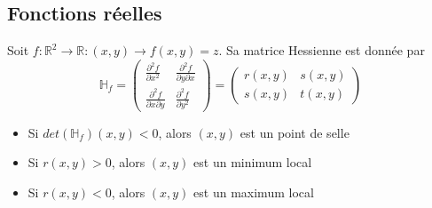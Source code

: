 \documentclass{article}
\begin{document}
\subsection{Fonctions réelles}
Soit $ f : \mathbb{R}^2 \rightarrow \mathbb{R} : (x, y) \rightarrow f(x, y) = z $. 
Sa matrice Hessienne est donnée par
\begin{equation}
    \mathbb{H}_f = 
    \begin{pmatrix}
       \frac{\partial^2f}{\partial x^2} & \frac{\partial^2f}{\partial y\partial x} \\
       \frac{\partial^2f}{\partial x\partial y} & \frac{\partial^2f}{\partial y^2} 
    \end{pmatrix}
    =
    \begin{pmatrix}
        r(x,y) & s(x,y) \\
        s(x,y) & t(x,y)
    \end{pmatrix}
\end{equation}

\begin{itemize}
    \item Si $det(\mathbb{H}_f)(x, y) < 0$, alors $(x, y)$ est un point de selle
    \item Si $r(x, y) > 0$, alors $(x, y)$ est un minimum local
    \item Si $r(x, y) < 0$, alors $(x, y)$ est un maximum local
\end{itemize}
\end{document}
